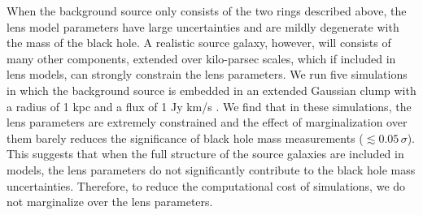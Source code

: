 \documentclass[chicago]{emulateapj}
\begin{document}
\begin{framed}
When the background source only consists of the two rings described above, the lens model parameters have large uncertainties and are mildly degenerate with the mass of the black hole. 
A realistic source galaxy, however, will consists of many other components, extended over kilo-parsec scales, which if included in lens models, can strongly constrain the lens parameters.
We run five simulations in which the background source is embedded in an extended Gaussian clump with a radius of 1 kpc and a flux of 1 Jy km/s \citep[typical for SMGs, see][]{Bothwell:12}. We find that in these simulations, the lens parameters are extremely constrained and the effect of marginalization over them barely reduces the significance of black hole mass measurements ($\lesssim 0.05\, \sigma$). This suggests that when the full structure of the source galaxies are included in models, the lens parameters do not significantly contribute to the black hole mass uncertainties. Therefore, to reduce the computational cost of simulations, we do not marginalize over the lens parameters.

\end{framed}
\end{document}
